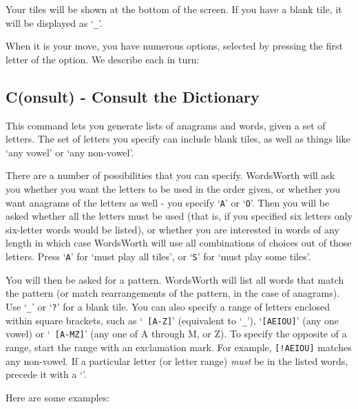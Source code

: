 Your tiles will be shown at the bottom of the screen. If you
have a blank tile, it will be displayed as `{\tt \_}'.

When it is your move, you have numerous options, selected by pressing
the first letter of the option. We describe each in turn:

\subsection{C(onsult) - Consult the Dictionary}

This command lets you generate lists of anagrams and words, given
a set of letters. The set of letters you specify can include blank tiles,
as well as things like `any vowel' or `any non-vowel'.

There are a number of possibilities that you can specify. WordsWorth
will ask you whether you want the letters to be used in the order given, 
or whether you want anagrams of the letters as well - you specify
`{\tt A}' or
`{\tt O}'. Then you will be asked whether all the letters must be used (that is,
if you specified six letters only six-letter words would be listed),
or whether you are interested in words of any length in which case 
WordsWorth will use all combinations of choices out of those letters.
Press `{\tt A}' for `must play all tiles', or `{\tt S}' for `must play some tiles'.

You will then be asked for a pattern. WordsWorth will list all words 
that match the pattern (or match rearrangements of the pattern, in the
case of anagrams). Use `{\tt \_}' or `{\tt ?}' for a blank tile. You can also specify
a range of letters enclosed within square brackets, such as `{\tt
[A-Z]}' 
(equivalent to `{\tt \_}'), `{\tt [AEIOU]}' (any one vowel) or `{\tt
[A-MZ]}' (any one of A through M, or Z). To specify the opposite of 
a range, start the range with an exclamation mark. For example, 
{\tt [!AEIOU]} matches any non-vowel. If a particular letter (or 
letter range) {\em must} be in the listed words, precede it with a
`{\tt *}'.

Here are some examples:

